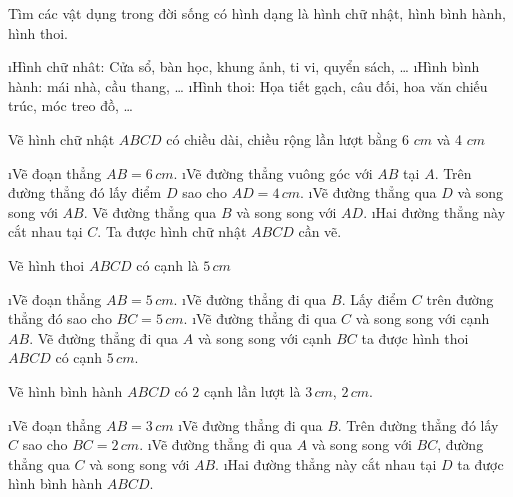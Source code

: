 \begin{bt}
	Tìm các vật dụng trong đời sống có hình dạng là hình chữ nhật, hình bình hành, hình thoi.
	\begin{loigiaichuong35}
		\begin{enumerate}[--, leftmargin=*]
			\i Hình chữ nhât: Cửa sổ, bàn học, khung ảnh, ti vi, quyển sách, \ldots
			\i Hình bình hành: mái nhà, cầu thang, \ldots
			\i Hình thoi: Họa tiết gạch, câu đối, hoa văn chiếu trúc, móc treo đồ, \ldots
		\end{enumerate}
	\end{loigiaichuong35}
\end{bt}
\begin{bt}
	Vẽ hình chữ nhật $ABCD$ có chiều dài, chiều rộng lần lượt bằng 6 $cm$  và 4 $cm$
	\begin{loigiaichuong35}
		\begin{enumerate}[Bước 1:, leftmargin=*]
			\i Vẽ đoạn thẳng $AB = 6\, cm$. 
			\i Vẽ đường thẳng vuông góc với $AB$ tại  $A$. Trên đường thẳng đó lấy điểm $D$ sao cho $AD = 4\, cm$. 
			\i Vẽ đường thẳng qua $D$ và song song với $AB$. Vẽ đường thẳng qua $B$ và song song với $AD$. 
			\i Hai đường thẳng này cắt nhau tại $C$. Ta được hình chữ nhật $ABCD$ cần vẽ.
		\end{enumerate}
	\end{loigiaichuong35}
\end{bt}
\begin{bt}
	Vẽ hình thoi $ABCD$ có cạnh là $5\, cm$
	\begin{loigiaichuong35}
		\begin{enumerate}[Bước 1:, leftmargin=*]
			\i Vẽ đoạn thẳng $AB = 5\,cm$.
			\i Vẽ đường thẳng đi qua $B$. Lấy điểm $C$  trên đường thẳng đó sao cho $BC = 5\,cm$. 
			\i Vẽ đường thẳng đi qua $C$ và song song với cạnh $AB$. Vẽ đường thẳng đi qua $A$ và song song với cạnh $BC$ ta được hình thoi $ABCD$ có cạnh $5\,cm$.
		\end{enumerate}
	\end{loigiaichuong35}
\end{bt}
\begin{bt}
	Vẽ hình bình hành $ABCD$ có $2$ cạnh lần lượt là $3\, cm$, $2\, cm$.
	\begin{loigiaichuong35}
		\begin{enumerate}[Bước 1:, leftmargin=*]
			\i Vẽ đoạn thẳng $AB = 3\,cm$ 
			\i Vẽ đường thẳng đi qua $B$. Trên đường thẳng đó lấy $C$ sao cho $BC= 2\,cm$. 
			\i Vẽ đường thẳng đi qua $A$ và song song với  $BC$, đường thẳng qua $C$  và song song với $AB$.    
			\i Hai đường thẳng này cắt nhau tại  $D$ ta được hình bình hành $ABCD$. 
		\end{enumerate}
	\end{loigiaichuong35}
\end{bt} 
